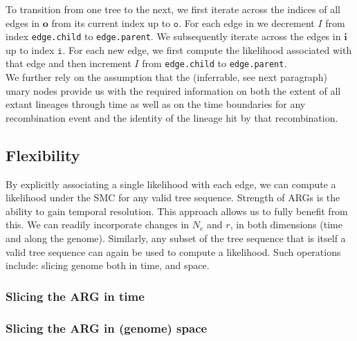 \documentclass{article}
\begin{document}
To transition from one tree to the next, we first iterate across the indices of all edges 
in $\textbf{o}$ from its current index up to $\texttt{o}$. For each edge in we decrement $I$ 
from index \texttt{edge.child} to \texttt{edge.parent}. We subsequently iterate across the 
edges in $\textbf{i}$ up to index $\texttt{i}$. For each new edge, we first compute the likelihood 
associated with that edge and then 
increment $I$ from \texttt{edge.child} to \texttt{edge.parent}.\\

We further rely on the assumption that the (inferrable, see next paragraph) unary nodes 
provide us with the required information on both the extent of all extant lineages through 
time as well as on the time boundaries for any recombination event and the identity of the 
lineage hit by that recombination.



\subsection{Flexibility}

By explicitly associating a single likelihood with each edge, we can compute a likelihood 
under the SMC for any valid tree sequence.
Strength of ARGs is the ability to gain temporal resolution. This approach allows us to fully 
benefit from this. %
We can readily incorporate changes in $N_e$ and $r$, in both dimensions (time and along the genome).
Similarly, any subset of the tree sequence that is itself a valid tree sequence can again 
be used to compute a likelihood. Such operations include: slicing genome both in time, and space.

\subsubsection{Slicing the ARG in time}

\subsubsection{Slicing the ARG in (genome) space}
\end{document}

